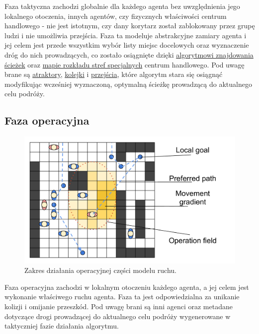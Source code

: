 \documentclass[a4paper, 12pt]{article}
\begin{document}

\noindent
Faza taktyczna zachodzi globalnie dla każdego agenta bez uwzględnienia jego lokalnego otoczenia, innych agentów, czy fizycznych właściwości centrum handlowego - nie jest istotnym, czy dany korytarz został zablokowany przez grupę ludzi i nie umożliwia przejścia. Faza ta modeluje abstrakcyjne zamiary agenta i jej celem jest przede wszystkim wybór listy miejsc docelowych oraz wyznaczenie dróg do nich prowadzących, co zostało osiągnięte dzięki \hyperref[sec:path-finding]{algorytmowi znajdowania ścieżek} oraz \hyperref[sec:mall-impl]{mapie rozkładu stref specjalnych} centrum handlowego. Pod uwagę brane są \hyperref[sec:attractors]{atraktory}, \hyperref[sec:queues]{kolejki} i \hyperref[sec:entrance-exits]{przejścia}, które algorytm stara się osiągnąć modyfikując wcześniej wyznaczoną, optymalną ścieżkę prowadzącą do aktualnego celu podróży.

        \subsection{Faza operacyjna}
        \label{sec:operational}

        \begin{figure}[H]
            \centering
            \includegraphics[scale=0.3]{./img/Operative.pdf}
            \caption{Zakres działania operacyjnej części modelu ruchu.}
            \label{fig:operational}
        \end{figure}


\noindent
Faza operacyjna zachodzi w lokalnym otoczeniu każdego agenta, a jej celem jest wykonanie właściwego ruchu agenta. Faza ta jest odpowiedzialna za unikanie kolizji i omijanie przeszkód. Pod uwagę brani są inni agenci oraz metadane dotyczące drogi prowadzącej do aktualnego celu podróży wygenerowane w taktyczniej fazie działania algorytmu.
\end{document}
